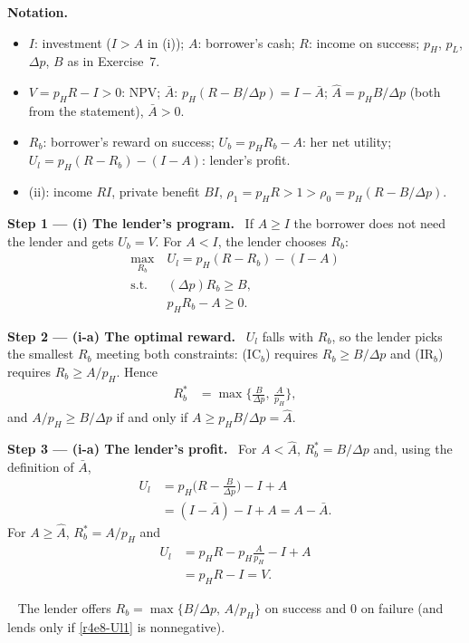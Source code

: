 \documentclass[11pt,a4paper]{article}
\newcommand{\notation}{\par\noindent\textbf{Notation.}}
\newcommand{\step}[2]{\par\medskip\noindent\textbf{Step #1 --- #2.}~}
\newcommand{\answer}[1]{\par\smallskip\noindent\fbox{\textbf{Answer #1.}}~}
\begin{document}
\notation
\begin{itemize}
  \item $I$: investment ($I>A$ in (i)); $A$: borrower's cash; $R$: income on success; $p_H$, $p_L$, $\Delta p$, $B$ as in Exercise~7.
  \item $V=p_HR-I>0$: NPV; $\bar A$: $p_H(R-B/\Delta p)=I-\bar A$; $\hat A=p_HB/\Delta p$ (both from the statement), $\bar A>0$.
  \item $R_b$: borrower's reward on success; $U_b=p_HR_b-A$: her net utility; $U_l=p_H(R-R_b)-(I-A)$: lender's profit.
  \item (ii): income $RI$, private benefit $BI$, $\rho_1=p_HR>1>\rho_0=p_H(R-B/\Delta p)$.
\end{itemize}

\step{1}{(i) The lender's program} If $A\ge I$ the borrower does not need the lender and gets
$U_b=V$. For $A<I$, the lender chooses $R_b$:
\begin{align}
  \max_{R_b}\ & U_l=p_H(R-R_b)-(I-A) \nonumber\\
  \text{s.t. }\ & (\Delta p)R_b\ge B, \tag{IC$_b$}\\
                & p_HR_b-A\ge 0. \tag{IR$_b$}
\end{align}

\step{2}{(i-a) The optimal reward} $U_l$ falls with $R_b$, so the lender picks the smallest
$R_b$ meeting both constraints: (IC$_b$) requires $R_b\ge B/\Delta p$ and (IR$_b$) requires
$R_b\ge A/p_H$. Hence
\begin{align}
  R_b^* &= \max\Big\{\frac{B}{\Delta p},\,\frac{A}{p_H}\Big\}, \label{r4e8-Rb}
\end{align}
and $A/p_H\ge B/\Delta p$ if and only if $A\ge p_HB/\Delta p=\hat A$.

\step{3}{(i-a) The lender's profit} For $A<\hat A$, $R_b^*=B/\Delta p$ and, using the definition
of $\bar A$,
\begin{align}
  U_l &= p_H\Big(R-\frac{B}{\Delta p}\Big)-I+A \nonumber\\
      &= (I-\bar A)-I+A = A-\bar A. \label{r4e8-Ul1}
\end{align}
For $A\ge\hat A$, $R_b^*=A/p_H$ and
\begin{align}
  U_l &= p_HR-p_H\frac{A}{p_H}-I+A \nonumber\\
      &= p_HR-I = V. \label{r4e8-Ul2}
\end{align}

\answer{(i-a)} The lender offers $R_b=\max\{B/\Delta p,\,A/p_H\}$ on success and $0$ on failure
(and lends only if \eqref{r4e8-Ul1} is nonnegative).
\end{document}
